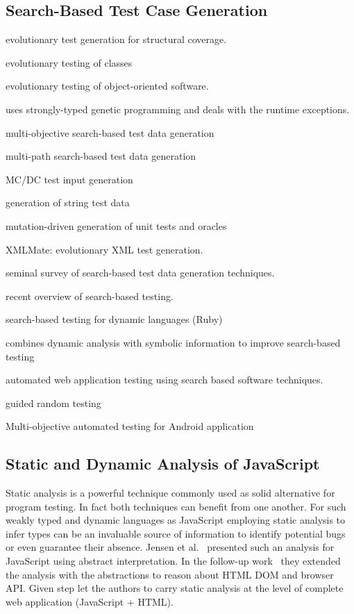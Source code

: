 \documentclass[sigconf,review, anonymous]{acmart}
\begin{document}
\subsection{Search-Based Test Case Generation}
\label{sub.sec.search.based}

\cite{wegener2001evolutionary} evolutionary test generation for structural coverage.

\cite{tonella2004evolutionary} evolutionary testing of classes

\cite{wappler2005using} evolutionary testing of object-oriented software.

\cite{wappler2006evolutionary} uses strongly-typed genetic programming and deals with the runtime exceptions.

\cite{lakhotia2007multi} multi-objective search-based test data generation 

\cite{cao2009search} multi-path search-based test data generation

\cite{awedikian2009mc} MC/DC test input generation 

\cite{shahbazi2016black} generation of string test data

\cite{fraser2012mutation} mutation-driven generation of unit tests and oracles

\cite{havrikov2014xmlmate} XMLMate: evolutionary XML test generation.

\cite{mcminn2004search} seminal survey of search-based test data generation techniques.

\cite{mcminn2011search} recent overview of search-based testing.

\cite{mairhofer2011search} search-based testing for dynamic languages (Ruby)

\cite{baars2011symbolic} combines dynamic analysis with symbolic information to improve search-based testing

\cite{alshahwan2011automated} automated web application testing using search based software techniques.

\cite{ma2015grt} guided random testing

\cite{mao2016sapienz} Multi-objective automated testing for Android application

\subsection{Static and Dynamic Analysis of JavaScript}
\label{sub.sec.js.static.anal}

Static analysis is a powerful technique commonly used as solid alternative for program testing. In fact both techniques can benefit from one another. For such weakly typed and dynamic languages as JavaScript employing static analysis to infer types can be an invaluable source of information to identify potential bugs or even guarantee their absence. Jensen et al.~\cite{tajs2009} presented such an analysis for JavaScript using abstract interpretation. In the follow-up work~\cite{dom2011} they extended the analysis with the abstractions to reason about HTML DOM and browser API. Given step let the authors to carry static analysis at the level of complete web application (JavaScript + HTML).
\cite{jquery2014}
\end{document}
